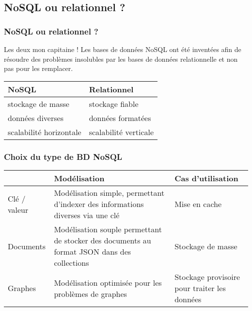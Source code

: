 	\subsection{NoSQL ou relationnel ?}
		\begin{frame}
			\frametitle{NoSQL ou relationnel ?}

			\begin{alertblock}{Les deux mon capitaine !}
				Les bases de données NoSQL ont été inventées afin de résoudre des problèmes insolubles par les bases de données relationnelle et non pas pour les remplacer.
			\end{alertblock}

			\vspace{20px}

			\begin{tabular}{|l|l|}
				\hline
				\textbf{NoSQL} & \textbf{Relationnel} \\ \hline\hline
				stockage de masse & stockage fiable \\ \hline
				données diverses & données formatées \\ \hline
				scalabilité horizontale & scalabilité verticale \\ \hline
			\end{tabular}
		\end{frame}

		\begin{frame}
			\frametitle{Choix du type de BD NoSQL}

			\begin{tabular}{|p{}|p{}|p{0.30\textwidth}|}
				\hline
				& Modélisation & Cas d'utilisation \\\hline
				Clé / valeur
				& Modélisation simple, permettant d'indexer des informations diverses via une clé
				& Mise en cache  \\\hline
				Documents
				& Modélisation souple permettant de stocker des documents au format JSON dans des collections
				& Stockage de masse \\\hline
				Graphes
				& Modélisation optimisée pour les problèmes de graphes
				& Stockage provisoire pour traiter les données \\\hline
			\end{tabular}
		\end{frame}